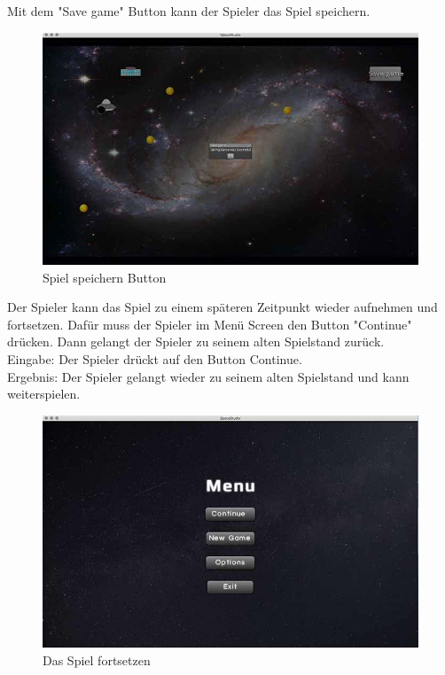 \documentclass[12pt]{article}
\begin{document}
Mit dem "Save game" Button kann der Spieler das Spiel speichern.\\
\begin{figure}[htp]
	\centering
	\includegraphics[scale=0.6]{TestProtocolBilder/save@0,25x.jpg}
	\caption{Spiel speichern Button}
\end{figure}
\clearpage
Der Spieler kann das Spiel zu einem späteren Zeitpunkt wieder aufnehmen und fortsetzen. Dafür muss der Spieler im Menü Screen den Button "Continue" drücken. Dann gelangt der Spieler zu seinem alten Spielstand zurück.\\
Eingabe: Der Spieler drückt auf den Button Continue.\\
Ergebnis: Der Spieler gelangt wieder zu seinem alten Spielstand und kann weiterspielen.\\
\begin{figure}[htp]
	\centering
	\includegraphics[scale=0.6]{TestProtocolBilder/continuebutton@0,25x.jpg}
	\caption{Das Spiel fortsetzen}
\end{figure}
\end{document}
